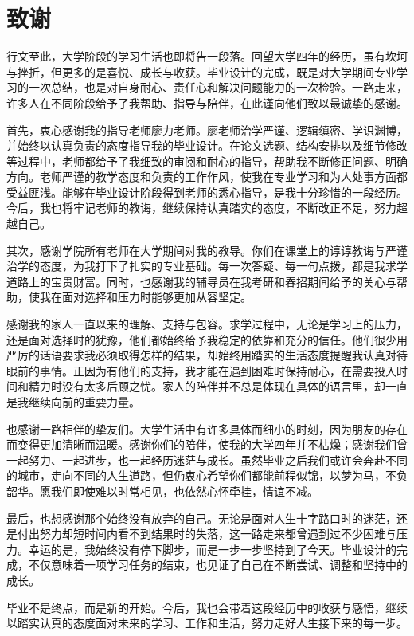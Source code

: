 \chapter*{致\hspace{2em}谢}
行文至此，大学阶段的学习生活也即将告一段落。回望大学四年的经历，虽有坎坷与挫折，但更多的是喜悦、成长与收获。毕业设计的完成，既是对大学期间专业学习的一次总结，也是对自身耐心、责任心和解决问题能力的一次检验。一路走来，许多人在不同阶段给予了我帮助、指导与陪伴，在此谨向他们致以最诚挚的感谢。

首先，衷心感谢我的指导老师廖力老师。廖老师治学严谨、逻辑缜密、学识渊博，并始终以认真负责的态度指导我的毕业设计。在论文选题、结构安排以及细节修改等过程中，老师都给予了我细致的审阅和耐心的指导，帮助我不断修正问题、明确方向。老师严谨的教学态度和负责的工作作风，使我在专业学习和为人处事方面都受益匪浅。能够在毕业设计阶段得到老师的悉心指导，是我十分珍惜的一段经历。今后，我也将牢记老师的教诲，继续保持认真踏实的态度，不断改正不足，努力超越自己。

其次，感谢学院所有老师在大学期间对我的教导。你们在课堂上的谆谆教诲与严谨治学的态度，为我打下了扎实的专业基础。每一次答疑、每一句点拨，都是我求学道路上的宝贵财富。同时，也感谢我的辅导员在我考研和春招期间给予的关心与帮助，使我在面对选择和压力时能够更加从容坚定。

感谢我的家人一直以来的理解、支持与包容。求学过程中，无论是学习上的压力，还是面对选择时的犹豫，他们都始终给予我稳定的依靠和充分的信任。他们很少用严厉的话语要求我必须取得怎样的结果，却始终用踏实的生活态度提醒我认真对待眼前的事情。正因为有他们的支持，我才能在遇到困难时保持耐心，在需要投入时间和精力时没有太多后顾之忧。家人的陪伴并不总是体现在具体的语言里，却一直是我继续向前的重要力量。

也感谢一路相伴的挚友们。大学生活中有许多具体而细小的时刻，因为朋友的存在而变得更加清晰而温暖。感谢你们的陪伴，使我的大学四年并不枯燥；感谢我们曾一起努力、一起进步，也一起经历迷茫与成长。虽然毕业之后我们或许会奔赴不同的城市，走向不同的人生道路，但仍衷心希望你们都能前程似锦，以梦为马，不负韶华。愿我们即使难以时常相见，也依然心怀牵挂，情谊不减。

最后，也想感谢那个始终没有放弃的自己。无论是面对人生十字路口时的迷茫，还是付出努力却短时间内看不到结果时的失落，这一路走来都曾遇到过不少困难与压力。幸运的是，我始终没有停下脚步，而是一步一步坚持到了今天。毕业设计的完成，不仅意味着一项学习任务的结束，也见证了自己在不断尝试、调整和坚持中的成长。

毕业不是终点，而是新的开始。今后，我也会带着这段经历中的收获与感悟，继续以踏实认真的态度面对未来的学习、工作和生活，努力走好人生接下来的每一步。
